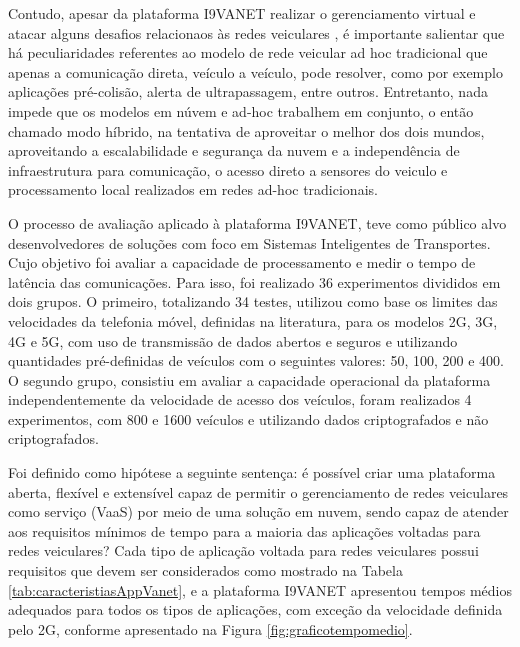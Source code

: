 \documentclass[
	12pt,				%
	oneside,			%
	a4paper,			%
	english,			%
	brazil				%
	]{abntex2ppgsi}
\begin{document}
Contudo, apesar da plataforma I9VANET realizar o gerenciamento virtual e atacar alguns desafios relacionaos às redes veiculares , é importante salientar que há peculiaridades referentes ao modelo de rede veicular ad hoc tradicional que apenas a comunicação direta, veículo a veículo, pode resolver, como por exemplo aplicações pré-colisão, alerta de ultrapassagem, entre outros. Entretanto, nada impede que os modelos em núvem e ad-hoc trabalhem em conjunto, o então chamado modo híbrido, na tentativa de aproveitar o melhor dos dois mundos, aproveitando a escalabilidade e segurança da nuvem e a independência de infraestrutura para comunicação, o acesso direto a sensores do veiculo e processamento local realizados em redes ad-hoc tradicionais. 

O processo de avaliação aplicado à plataforma I9VANET, teve como público alvo desenvolvedores de soluções com foco em Sistemas Inteligentes de Transportes. Cujo objetivo foi avaliar a capacidade de processamento e medir o tempo de latência das comunicações. Para isso, foi realizado 36 experimentos divididos em dois  grupos. O primeiro, totalizando 34 testes, utilizou como base os limites das velocidades da telefonia móvel, definidas na literatura, para os modelos 2G, 3G, 4G e 5G, com uso de transmissão de dados abertos e seguros e utilizando quantidades pré-definidas de veículos com o seguintes valores: 50, 100, 200 e 400. O segundo grupo, consistiu em avaliar a capacidade operacional da plataforma independentemente da velocidade de acesso dos veículos, foram realizados 4 experimentos, com 800 e 1600 veículos e utilizando dados criptografados e não criptografados.

Foi definido como hipótese a seguinte sentença: é possível criar uma plataforma aberta, flexível e extensível capaz de permitir o gerenciamento de redes veiculares como serviço (VaaS) por meio de uma solução em nuvem, sendo capaz de atender aos requisitos mínimos de tempo para a maioria das aplicações voltadas para redes veiculares? Cada tipo de aplicação voltada para redes veiculares possui requisitos que devem ser considerados como mostrado na Tabela \ref{tab:caracteristiasAppVanet}, e a plataforma I9VANET apresentou tempos médios adequados para todos os tipos de aplicações, com exceção da velocidade definida pelo 2G, conforme apresentado na Figura \ref{fig:graficotempomedio}.

\end{document}
